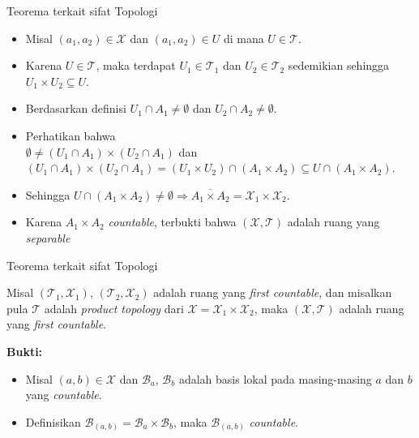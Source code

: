     \begin{frame}{Teorema terkait sifat Topologi}
        \begin{itemize}
            \item Misal $(a_1,a_2)\in \mathcal{X}$ dan $(a_1,a_2)\in U$ di mana $U\in \mathcal{T}$.
            \item Karena $U\in\mathcal{T}$, maka terdapat $U_1\in\mathcal{T}_1$ dan $U_2\in\mathcal{T}_2$ sedemikian sehingga $U_1\times U_2\subseteq U$.
            \item Berdasarkan definisi $U_1\cap A_1\neq \emptyset$ dan $U_2\cap A_2\neq\emptyset$.
            \item Perhatikan bahwa\\
            $\emptyset\neq(U_1\cap A_1)\times(U_2\cap A_1)$ dan $(U_1\cap A_1)\times(U_2\cap A_1) = (U_1\times U_2)\cap(A_1\times A_2)\subseteq U\cap(A_1\times A_2)$.
            \item Sehingga $U\cap(A_1\times A_2)\neq \emptyset\Rightarrow \overline{A_1\times A_2} = \mathcal{X}_1\times\mathcal{X}_2$. 
            \item Karena $A_1\times A_2$ \textit{countable}, terbukti bahwa $(\mathcal{X},\mathcal{T})$ adalah ruang yang \textit{separable}
        \end{itemize}
    \end{frame}
    
    \begin{frame}{Teorema terkait sifat Topologi}
    \begin{tcolorbox}[enhanced,title=Teorema 2.25,frame style tile={width=\paperwidth}{wallpaper}]
        Misal $(\mathcal{T}_1,\mathcal{X}_1)$, $(\mathcal{T}_2,\mathcal{X}_2)$ adalah ruang yang \textit{first countable}, dan misalkan pula $\mathcal{T}$ adalah \textit{product topology} dari $\mathcal{X}=\mathcal{X}_1\times\mathcal{X}_2$, maka $(\mathcal{X},\mathcal{T})$ adalah ruang yang \textit{first countable}.
    \end{tcolorbox}
    \textbf{Bukti:}
    \begin{itemize}
        \item Misal $(a,b)\in\mathcal{X}$ dan $\mathcal{B}_{a}$, $\mathcal{B}_{b}$ adalah basis lokal pada masing-masing $a$ dan $b$ yang \textit{countable}.
        \item Definisikan $\mathcal{B}_{(a,b)} = \mathcal{B}_{a}\times\mathcal{B}_{b}$, maka $\mathcal{B}_{(a,b)}$ \textit{countable}.
    \end{itemize}
    \end{frame}
    
